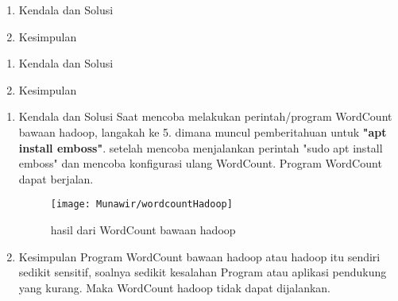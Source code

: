\begin{enumerate}
\item Kendala dan Solusi

\item Kesimpulan

\end{enumerate}

\begin{enumerate}
\item Kendala dan Solusi

\item Kesimpulan

\end{enumerate}

\begin{enumerate}
\item Kendala dan Solusi
Saat mencoba melakukan perintah/program WordCount bawaan hadoop, langakah ke 5. dimana muncul pemberitahuan untuk {\textbf{"apt install emboss"}}. setelah mencoba menjalankan perintah "sudo apt install emboss" dan mencoba konfigurasi ulang WordCount. Program WordCount dapat berjalan.

\begin{figure}[!ht]
    \texttt{[image: Munawir/wordcountHadoop]}
    \caption{hasil dari WordCount bawaan hadoop}
    \label{gam:perkuliahan-25-11}
    \end{figure}

\item Kesimpulan
Program WordCount bawaan hadoop atau hadoop itu sendiri sedikit sensitif, soalnya sedikit kesalahan Program atau aplikasi pendukung yang kurang. Maka WordCount hadoop tidak dapat dijalankan.
\end{enumerate}

